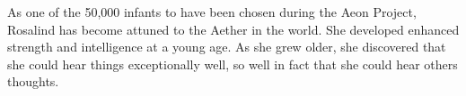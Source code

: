 \documentclass[12pt,titlepage]{article}
\begin{document}
As one of the 50,000 infants to have been chosen during the Aeon Project,
Rosalind has become attuned to the Aether in the world. She developed enhanced
strength and intelligence at a young age. As she grew older, she discovered that
she could hear things exceptionally well, so well in fact that she could hear
others thoughts.


\newpage








\end{document}
